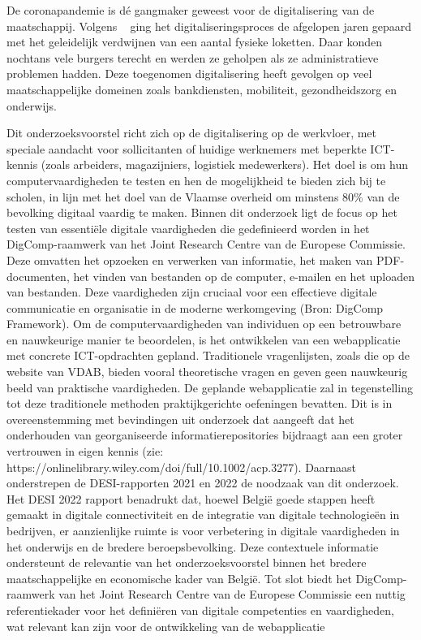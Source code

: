 De coronapandemie is dé gangmaker geweest voor de digitalisering van de maatschappij. Volgens ~\textcite{Unia} ging het digitaliseringsproces de afgelopen jaren gepaard met het geleidelijk verdwijnen van een aantal fysieke loketten. Daar konden nochtans vele burgers terecht en werden ze geholpen als ze administratieve problemen hadden. Deze toegenomen digitalisering heeft gevolgen op veel maatschappelijke domeinen zoals bankdiensten, mobiliteit, gezondheidszorg en onderwijs.

Dit onderzoeksvoorstel richt zich op de digitalisering op de werkvloer, met speciale aandacht voor sollicitanten of huidige werknemers met beperkte ICT-kennis (zoals arbeiders, magazijniers, logistiek medewerkers). Het doel is om hun computervaardigheden te testen en hen de mogelijkheid te bieden zich bij te scholen, in lijn met het doel van de Vlaamse overheid om minstens 80\% van de bevolking digitaal vaardig te maken.
Binnen dit onderzoek ligt de focus op het testen van essentiële digitale vaardigheden die gedefinieerd worden in het DigComp-raamwerk van het Joint Research Centre van de Europese Commissie. Deze omvatten het opzoeken en verwerken van informatie, het maken van PDF-documenten, het vinden van bestanden op de computer, e-mailen en het uploaden van bestanden. Deze vaardigheden zijn cruciaal voor een effectieve digitale communicatie en organisatie in de moderne werkomgeving (Bron: DigComp Framework).
Om de computervaardigheden van individuen op een betrouwbare en nauwkeurige manier te beoordelen, is het ontwikkelen van een webapplicatie met concrete ICT-opdrachten gepland. Traditionele vragenlijsten, zoals die op de website van VDAB, bieden vooral theoretische vragen en geven geen nauwkeurig beeld van praktische vaardigheden.
De geplande webapplicatie zal in tegenstelling tot deze traditionele methoden praktijkgerichte oefeningen bevatten. Dit is in overeenstemming met bevindingen uit onderzoek dat aangeeft dat het onderhouden van georganiseerde informatierepositories bijdraagt aan een groter vertrouwen in eigen kennis (zie: https://onlinelibrary.wiley.com/doi/full/10.1002/acp.3277).
Daarnaast onderstrepen de DESI-rapporten 2021 en 2022 de noodzaak van dit onderzoek. Het DESI 2022 rapport benadrukt dat, hoewel België goede stappen heeft gemaakt in digitale connectiviteit en de integratie van digitale technologieën in bedrijven, er aanzienlijke ruimte is voor verbetering in digitale vaardigheden in het onderwijs en de bredere beroepsbevolking. Deze contextuele informatie ondersteunt de relevantie van het onderzoeksvoorstel binnen het bredere maatschappelijke en economische kader van België.
Tot slot biedt het DigComp-raamwerk van het Joint Research Centre van de Europese Commissie een nuttig referentiekader voor het definiëren van digitale competenties en vaardigheden, wat relevant kan zijn voor de ontwikkeling van de webapplicatie %

